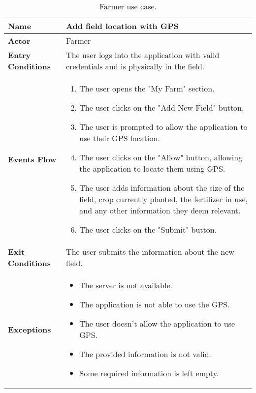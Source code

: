 \begin{table}[hbt!]
\centering
\caption{\label{table:addOne{table_counter}}Farmer use case.}
\renewcommand{\arraystretch}{1.25}
\begin{tabular}{|l|>{\raggedright\arraybackslash}m{12cm}|}

    \hline
    \textbf{Name} & Add field location with GPS\\
    \hline
   	\textbf{Actor} & Farmer\\
    \hline
    \textbf{Entry Conditions} & The user logs into the application with valid credentials and is physically in the field.\\
    \hline
    \textbf{Events Flow} & 
    		\begin{enumerate}
    			\item The user opens the "My Farm" section.
    			\item The user clicks on the "Add New Field" button.
    			\item The user is prompted to allow the application to use their GPS location.
    			\item The user clicks on the "Allow" button, allowing the application to locate them using GPS.
    			\item The user adds information about the size of the field, crop currently planted, the fertilizer in use, and any other information they deem relevant.
    			\item The user clicks on the "Submit" button.
    		\end{enumerate}
    	\\
    \hline
    \textbf{Exit Conditions} & The user submits the information about the new field.\\
    \hline
    \textbf{Exceptions} & 
    		\begin{itemize}
    			\item The server is not available.
    			\item The application is not able to use the GPS.
    			\item The user doesn't allow the application to use GPS.
    			\item The provided information is not valid.
    			\item Some required information is left empty.
    		\end{itemize}
    \\
    \hline
\end{tabular}
\end{table}